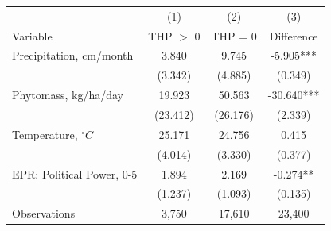 \begin{tabular}{l*{3}c}
\toprule
 & (1) & (2) & (3) \\
Variable & THP $>$ 0 & THP = 0 & Difference \\
\midrule
Precipitation, cm/month&3.840&9.745&-5.905***\\
&(3.342)&(4.885)&(0.349)\\
Phytomass, kg/ha/day&19.923&50.563&-30.640***\\
&(23.412)&(26.176)&(2.339)\\
Temperature, $^{\circ}C$&25.171&24.756&0.415\\
&(4.014)&(3.330)&(0.377)\\
EPR: Political Power, 0-5&1.894&2.169&-0.274**\\
&(1.237)&(1.093)&(0.135)\\
\midrule
Observations & 3,750 & 17,610 & 23,400 \\
\bottomrule
\end{tabular}
